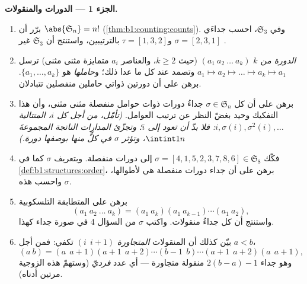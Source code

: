 \begin{problem}
\medskip
\noindent\textbf{الجزء 1 --- الدورات والمنقولات.}
\begin{enumerate}
  \item برّر أن $\abs{\mathfrak S_n} = n!$
        (\cref{thm:b1:counting:counts}). وفي $\mathfrak S_3$،
        احسب جداءَي $\sigma = [2, 3, 1]$ و$\tau =
        [1, 3, 2]$ بالترتيبين، واستنتج أن $\mathfrak S_3$ غير
        .
  \item \emph{الدورة من  $k$} $(a_1\ a_2\ \dots\ a_k)$ (حيث $k \geq 2$،
        والعناصر $a_i$ متمايزة مثنى مثنى) ترسل $a_1 \mapsto a_2
        \mapsto \dots \mapsto a_k \mapsto a_1$ وتصمد عند
        كل ما عدا ذلك؛ و\emph{حاملها} هو $\{a_1, \dots,
        a_k\}$. برهن على أن دورتين ذواتي حاملين منفصلين
        تتبادلان.
  \item برهن على أن كل $\sigma \in \mathfrak S_n$ جداءُ
        دورات ذوات حوامل منفصلة مثنى مثنى، وأن هذا
        التفكيك وحيد بغضّ النظر عن ترتيب العوامل.
        \emph{(تأمّل، من أجل كل $i$، المتتالية $i, \sigma(i),
        \sigma^2(i), \dots$: فلا بدّ أن تعود إلى $i$؛ وتجزّئ
        \emph{المدارات} الناتجة المجموعةَ $\intint1n$، وتؤثر $\sigma$ في
        كلٍّ منها بوصفها دورة.)}
  \item فكّك $\sigma = [4, 1, 5, 2, 3, 7, 8, 6] \in
        \mathfrak S_8$ إلى دورات منفصلة. وبتعريف
        \emph{} $\sigma$ كما في
        \cref{def:b1:structures:order}، برهن على أن  جداء
        دورات منفصلة هي  لأطوالها،
        واحسب  هذه $\sigma$.
  \item برهن على المتطابقة التلسكوبية
        \[
        (a_1\ a_2\ \dots\ a_k)
        = (a_1\ a_k)(a_1\ a_{k-1})\cdots(a_1\ a_2) ,
        \]
        واستنتج أن كل  جداءُ
        منقولات. واكتب $\sigma$ من السؤال 4 في صورة جداء
        كهذا.
  \item بيّن كذلك أن المنقولات \emph{المتجاورة}
        $(i\ \ i{+}1)$ تكفي: فمن أجل $a < b$،
        \[
        (a\ b) = (a\ \ a{+}1)(a{+}1\ \ a{+}2)\cdots(b{-}1\ \ b)
        \cdots(a{+}1\ \ a{+}2)(a\ \ a{+}1),
        \]
        وهو جداء $2(b - a) - 1$ منقولة متجاورة ---
        أي عدد \emph{فرديّ} (وستهمّ هذه الزوجية مرتين
        أدناه).
\end{enumerate}


\end{problem}
